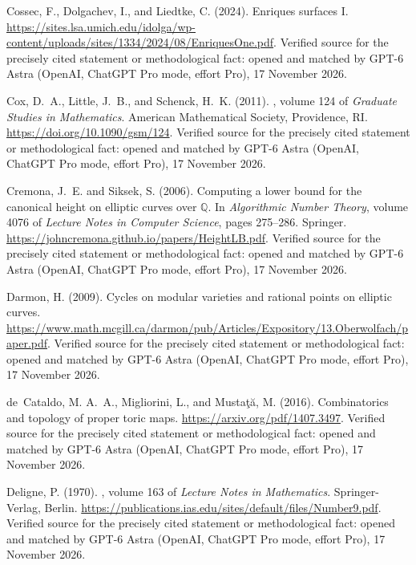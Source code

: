 \begin{thebibliography}{}
Cossec, F., Dolgachev, I., and Liedtke, C. (2024).
\newblock Enriques surfaces {I}.
\newblock \url{https://sites.lsa.umich.edu/idolga/wp-content/uploads/sites/1334/2024/08/EnriquesOne.pdf}. Verified source for the precisely cited statement or methodological fact: opened and matched by GPT-6 Astra (OpenAI, ChatGPT Pro mode, effort Pro), 17 November 2026.

Cox, D.~A., Little, J.~B., and Schenck, H.~K. (2011).
, volume 124 of {\em Graduate Studies in
  Mathematics}.
\newblock American Mathematical Society, Providence, RI.
\newblock \url{https://doi.org/10.1090/gsm/124}. Verified source for the precisely cited statement or methodological fact: opened and matched by GPT-6 Astra (OpenAI, ChatGPT Pro mode, effort Pro), 17 November 2026.

Cremona, J.~E. and Siksek, S. (2006).
\newblock Computing a lower bound for the canonical height on elliptic curves
  over {$\mathbb Q$}.
\newblock In {\em Algorithmic Number Theory}, volume 4076 of {\em Lecture Notes
  in Computer Science}, pages 275--286. Springer.
\newblock \url{https://johncremona.github.io/papers/HeightLB.pdf}. Verified source for the precisely cited statement or methodological fact: opened and matched by GPT-6 Astra (OpenAI, ChatGPT Pro mode, effort Pro), 17 November 2026.

Darmon, H. (2009).
\newblock Cycles on modular varieties and rational points on elliptic curves.
\newblock \url{https://www.math.mcgill.ca/darmon/pub/Articles/Expository/13.Oberwolfach/paper.pdf}. Verified source for the precisely cited statement or methodological fact: opened and matched by GPT-6 Astra (OpenAI, ChatGPT Pro mode, effort Pro), 17 November 2026.

de~Cataldo, M. A.~A., Migliorini, L., and Musta\c{t}\u{a}, M. (2016).
\newblock Combinatorics and topology of proper toric maps.
\newblock \url{https://arxiv.org/pdf/1407.3497}. Verified source for the precisely cited statement or methodological fact: opened and matched by GPT-6 Astra (OpenAI, ChatGPT Pro mode, effort Pro), 17 November 2026.

Deligne, P. (1970).
, volume 163 of {\em Lecture Notes in Mathematics}.
\newblock Springer-Verlag, Berlin.
\newblock \url{https://publications.ias.edu/sites/default/files/Number9.pdf}. Verified source for the precisely cited statement or methodological fact: opened and matched by GPT-6 Astra (OpenAI, ChatGPT Pro mode, effort Pro), 17 November 2026.


\end{thebibliography}
